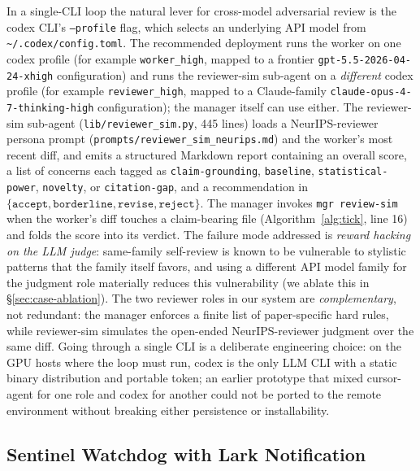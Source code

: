 In a single-CLI loop the natural lever for cross-model adversarial
review is the codex CLI's \texttt{--profile} flag, which selects an
underlying API model from \texttt{\textasciitilde/.codex/config.toml}.
The recommended deployment runs the worker on one codex profile (for
example \texttt{worker\_high}, mapped to a frontier
\texttt{gpt-5.5-2026-04-24-xhigh} configuration) and runs the
reviewer-sim sub-agent on a \emph{different} codex profile (for
example \texttt{reviewer\_high}, mapped to a Claude-family
\texttt{claude-opus-4-7-thinking-high} configuration); the manager
itself can use either. The reviewer-sim sub-agent
(\texttt{lib/reviewer\_sim.py}, 445 lines) loads a NeurIPS-reviewer
persona prompt (\texttt{prompts/reviewer\_sim\_neurips.md}) and the
worker's most recent diff, and emits a structured Markdown report
containing an overall score, a list of concerns each tagged as
\texttt{claim-grounding}, \texttt{baseline}, \texttt{statistical-power},
\texttt{novelty}, or \texttt{citation-gap}, and a recommendation in
\(\{\texttt{accept},\texttt{borderline},\texttt{revise},\texttt{reject}\}\).
The manager invokes \texttt{mgr review-sim} when the worker's diff
touches a claim-bearing file (Algorithm~\ref{alg:tick}, line 16) and
folds the score into its verdict. The failure mode addressed is
\emph{reward hacking on the LLM judge}: same-family self-review is
known to be vulnerable to stylistic patterns that the family itself
favors, and using a different API model family for the judgment role
materially reduces this vulnerability (we ablate this in
\S\ref{sec:case-ablation}). The two reviewer roles in our system
are \emph{complementary}, not redundant: the manager enforces a
finite list of paper-specific hard rules, while reviewer-sim
simulates the open-ended NeurIPS-reviewer judgment over the same
diff. Going through a single CLI is a deliberate engineering choice:
on the GPU hosts where the loop must run, codex is the only LLM CLI
with a static binary distribution and portable token; an earlier
prototype that mixed cursor-agent for one role and codex for another
could not be ported to the remote environment without breaking
either persistence or installability.

\subsection{Sentinel Watchdog with Lark Notification}
\label{sec:discipline-sentinel}

